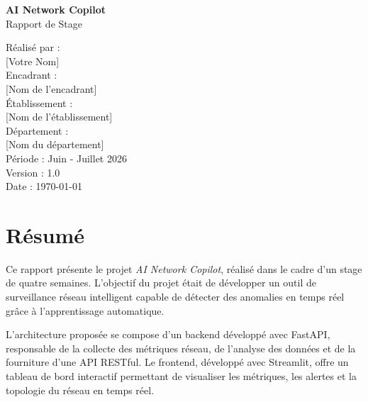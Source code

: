 \documentclass[12pt,a4paper]{report}
\begin{document}
\begin{titlepage}
    \centering
    \vspace*{2cm}

    {\LARGE \textbf{AI Network Copilot}}\\[1.5cm]

    {\Large Rapport de Stage}\\[0.5cm]

    \vspace{1cm}

    {\large Réalisé par :}\\
    {\large [Votre Nom]}\\[0.5cm]

    {\large Encadrant :}\\
    {\large [Nom de l'encadrant]}\\[0.5cm]

    {\large Établissement :}\\
    {\large [Nom de l'établissement]}\\[0.5cm]

    {\large Département :}\\
    {\large [Nom du département]}\\[2cm]

    {\large Période : Juin - Juillet 2026}\\[1cm]

    {\large Version : 1.0}\\[0.5cm]

    {\large Date : \today}\\[2cm]

    \vfill

    \vfill
\end{titlepage}

\chapter*{Résumé}
\thispagestyle{empty}

Ce rapport présente le projet \textit{AI Network Copilot}, réalisé dans le cadre d'un stage de quatre semaines. L'objectif du projet était de développer un outil de surveillance réseau intelligent capable de détecter des anomalies en temps réel grâce à l'apprentissage automatique.

L'architecture proposée se compose d'un backend développé avec FastAPI, responsable de la collecte des métriques réseau, de l'analyse des données et de la fourniture d'une API RESTful. Le frontend, développé avec Streamlit, offre un tableau de bord interactif permettant de visualiser les métriques, les alertes et la topologie du réseau en temps réel.
\end{document}
